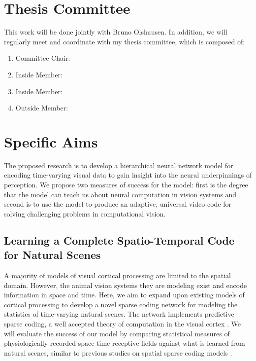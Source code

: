 \documentclass[smallextended]{svjour3}       %
\begin{document}
\section{Thesis Committee} \label{committee}
\noindent This work will be done jointly with Bruno Olshausen. In addition, we will regularly meet and coordinate with my thesis committee, which is composed of:\\
\begin{enumerate}
    \item
        Committee Chair:
    \item
        Inside Member:
    \item
        Inside Member:
    \item
        Outside Member:
\end{enumerate}

\section{Specific Aims} \label{aims}
\noindent The proposed research is to develop a hierarchical neural network model for encoding time-varying visual data to gain insight into the neural underpinnings of perception. We propose two measures of success for the model: first is the degree that the model can teach us about neural computation in vision systems and second is to use the model to produce an adaptive, universal video code for solving challenging problems in computational vision.

\subsection{Learning a Complete Spatio-Temporal Code for Natural Scenes} \label{aim1}
\noindent A majority of models of visual cortical processing are limited to the spatial domain. However, the animal vision systems they are modeling exist and encode information in space and time. Here, we aim to expand upon existing models of cortical processing to develop a novel sparse coding network for modeling the statistics of time-varying natural scenes. The network implements predictive sparse coding, a well accepted theory of computation in the visual cortex \cite{olshausen1997sparse,rao1999predictive}. We will evaluate the success of our model by comparing statistical measures of physiologically recorded space-time receptive fields against what is learned from natural scenes, similar to previous studies on spatial sparse coding models \cite{rehn2007network,zylberberg2011sparse}.
\end{document}
